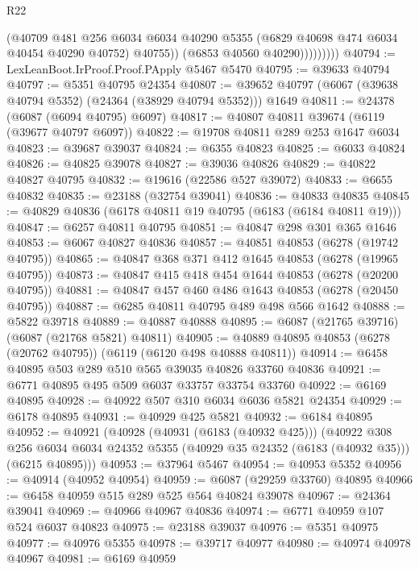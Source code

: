 \begin{lexlean}{R22}
\begin{coremodule}
                      (@40709
                        @481
                        @256
                        @6034
                        @6034
                        @40290
                        @5355
                        (@6829 @40698 @474 @6034 @40454 @40290 @40752)
                        @40755))
                    (@6853 @40560 @40290)))))))))
@40794 := LexLeanBoot.IrProof.Proof.PApply @5467 @5470
@40795 := @39633 @40794
@40797 := @5351 @40795 @24354
@40807 := @39652 @40797 (@6067 (@39638 @40794 @5352) (@24364 (@38929 @40794 @5352))) @1649
@40811 := @24378 (@6087 (@6094 @40795) @6097)
@40817 := @40807 @40811 @39674 (@6119 (@39677 @40797 @6097))
@40822 := @19708 @40811 @289 @253 @1647 @6034
@40823 := @39687 @39037
@40824 := @6355 @40823
@40825 := @6033 @40824
@40826 := @40825 @39078
@40827 := @39036 @40826
@40829 := @40822 @40827 @40795
@40832 := @19616 (@22586 @527 @39072)
@40833 := @6655 @40832
@40835 := @23188 (@32754 @39041)
@40836 := @40833 @40835
@40845 := @40829 @40836 (@6178 @40811 @19 @40795 (@6183 (@6184 @40811 @19)))
@40847 := @6257 @40811 @40795
@40851 := @40847 @298 @301 @365 @1646
@40853 := @6067 @40827 @40836
@40857 := @40851 @40853 (@6278 (@19742 @40795))
@40865 := @40847 @368 @371 @412 @1645 @40853 (@6278 (@19965 @40795))
@40873 := @40847 @415 @418 @454 @1644 @40853 (@6278 (@20200 @40795))
@40881 := @40847 @457 @460 @486 @1643 @40853 (@6278 (@20450 @40795))
@40887 := @6285 @40811 @40795 @489 @498 @566 @1642
@40888 := @5822 @39718
@40889 := @40887 @40888
@40895 := @6087 (@21765 @39716) (@6087 (@21768 @5821) @40811)
@40905 := @40889 @40895 @40853 (@6278 (@20762 @40795)) (@6119 (@6120 @498 @40888 @40811))
@40914 := @6458 @40895 @503 @289 @510 @565 @39035 @40826 @33760 @40836
@40921 := @6771 @40895 @495 @509 @6037 @33757 @33754 @33760
@40922 := @6169 @40895
@40928 := @40922 @507 @310 @6034 @6036 @5821 @24354
@40929 := @6178 @40895
@40931 := @40929 @425 @5821
@40932 := @6184 @40895
@40952 := @40921
    (@40928
      (@40931 (@6183 (@40932 @425)))
      (@40922
        @308
        @256
        @6034
        @6034
        @24352
        @5355
        (@40929 @35 @24352 (@6183 (@40932 @35)))
        (@6215 @40895)))
@40953 := @37964 @5467
@40954 := @40953 @5352
@40956 := @40914 (@40952 @40954)
@40959 := @6087 (@29259 @33760) @40895
@40966 := @6458 @40959 @515 @289 @525 @564 @40824 @39078
@40967 := @24364 @39041
@40969 := @40966 @40967 @40836
@40974 := @6771 @40959 @107 @524 @6037 @40823
@40975 := @23188 @39037
@40976 := @5351 @40975
@40977 := @40976 @5355
@40978 := @39717 @40977
@40980 := @40974 @40978 @40967
@40981 := @6169 @40959

\end{coremodule}
\end{lexlean}
